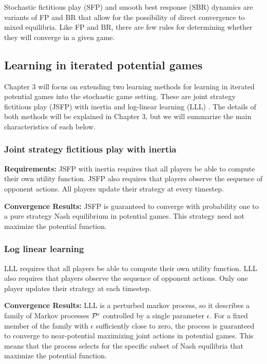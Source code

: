 Stochastic fictitious play (SFP) \cite{fudenberg1993learning} and smooth best response (SBR) dynamics \cite{hofbauer2005learning} are variants of FP and BR that allow for the possibility of direct convergence to mixed equilibria. Like FP and BR, there are few rules for determining whether they will converge in a given game.


\subsection{Learning in iterated potential games}

Chapter 3 will focus on extending two learning methods for learning in iterated potential games into the stochastic game setting. These are joint strategy fictitious play (JSFP) with inertia \cite{marden2009joint} and log-linear learning (LLL) \cite{young1993evolution, marden2012revisiting}.  The details of both methods will be explained in Chapter 3, but we will summarize the main characteristics of each below.

\subsubsection{Joint strategy fictitious play with inertia}

\hspace{.25in} {\bf Requirements: } JSFP with inertia requires that all players be able to compute their own utility function. JSFP also requires that players observe the sequence of opponent actions. All players update their strategy at every timestep.

{\bf Convergence Results: } JSFP is guaranteed to converge with probability one to a pure strategy Nash equilibrium in potential games. This strategy need not maximize the potential function. 

\subsubsection{Log linear learning}

\hspace{.25in}{\bf Requirements: } LLL requires that all players be able to compute their own utility function. LLL also requires that players observe the sequence of opponent actions. Only one player updates their strategy at each timestep.

{\bf Convergence Results: } LLL is a perturbed markov process, so it describes a family of Markov processes $\mathcal{P}^{\epsilon}$ controlled by a single parameter $\epsilon$. For a fixed member of the family with $\epsilon$ sufficiently close to zero, the process is guaranteed to converge to near-potential maximizing joint actions in potential games. This means that the process selects for the specific subset of Nash equilibria that maximize the potential function.






